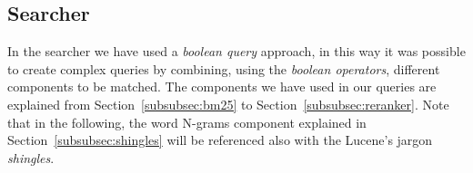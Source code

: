 \subsection{Searcher}
\label{subsec:searcher}

In the searcher we have used a \emph{boolean query} approach, in this way it was possible to create complex queries by combining, using the \emph{boolean operators}, different components to be matched. The components we have used in our queries are explained from Section~\ref{subsubsec:bm25} to Section~\ref{subsubsec:reranker}. Note that in the following, the word N-grams component explained in Section~\ref{subsubsec:shingles} will be referenced also with the Lucene's jargon \emph{shingles}.









